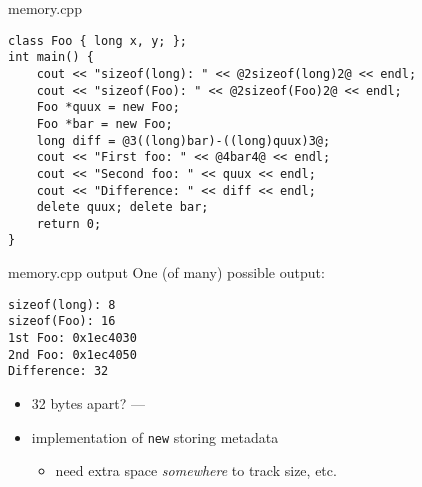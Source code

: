 \begin{frame}[fragile,label=memCpp]{memory.cpp}
\begin{lstlisting}
class Foo { long x, y; };
int main() {
    cout << "sizeof(long): " << @2sizeof(long)2@ << endl;
    cout << "sizeof(Foo): " << @2sizeof(Foo)2@ << endl;
    Foo *quux = new Foo;
    Foo *bar = new Foo;
    long diff = @3((long)bar)-((long)quux)3@;
    cout << "First foo: " << @4bar4@ << endl;
    cout << "Second foo: " << quux << endl;
    cout << "Difference: " << diff << endl;
    delete quux; delete bar;
    return 0;
}
\end{lstlisting}
\end{frame}

\begin{frame}[fragile,label=memCppOut]{memory.cpp output}
One (of many) possible output:
\begin{Verbatim}
sizeof(long): 8
sizeof(Foo): 16
1st Foo: 0x1ec4030
2nd Foo: 0x1ec4050
Difference: 32
\end{Verbatim}
\begin{itemize}
\item 32 bytes apart? --- 
\item implementation of \texttt{new} storing metadata
    \begin{itemize}
    \item need extra space \textit{somewhere} to track size, etc.
    \end{itemize}
\end{itemize}
\end{frame}
